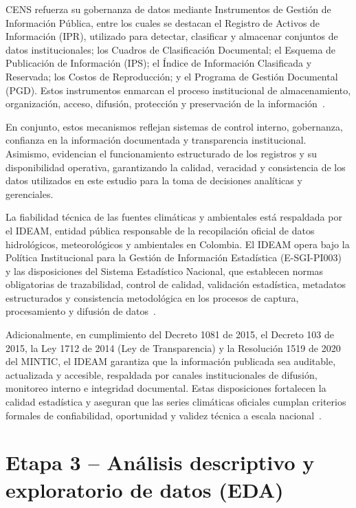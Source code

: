CENS refuerza su gobernanza de datos mediante Instrumentos de Gestión de Información Pública, entre los cuales se destacan el Registro de Activos de Información (IPR), utilizado para detectar, clasificar y almacenar conjuntos de datos institucionales; los Cuadros de Clasificación Documental; el Esquema de Publicación de Información (IPS); el Índice de Información Clasificada y Reservada; los Costos de Reproducción; y el Programa de Gestión Documental (PGD). Estos instrumentos enmarcan el proceso institucional de almacenamiento, organización, acceso, difusión, protección y preservación de la información~\cite{ref40}.

En conjunto, estos mecanismos reflejan sistemas de control interno, gobernanza, confianza en la información documentada y transparencia institucional. Asimismo, evidencian el funcionamiento estructurado de los registros y su disponibilidad operativa, garantizando la calidad, veracidad y consistencia de los datos utilizados en este estudio para la toma de decisiones analíticas y gerenciales.

La fiabilidad técnica de las fuentes climáticas y ambientales está respaldada por el IDEAM, entidad pública responsable de la recopilación oficial de datos hidrológicos, meteorológicos y ambientales en Colombia. El IDEAM opera bajo la Política Institucional para la Gestión de Información Estadística (E-SGI-PI003)~\cite{ref41} y las disposiciones del Sistema Estadístico Nacional, que establecen normas obligatorias de trazabilidad, control de calidad, validación estadística, metadatos estructurados y consistencia metodológica en los procesos de captura, procesamiento y difusión de datos~\cite{ref42}.

Adicionalmente, en cumplimiento del Decreto 1081 de 2015, el Decreto 103 de 2015, la Ley 1712 de 2014 (Ley de Transparencia) y la Resolución 1519 de 2020 del MINTIC, el IDEAM garantiza que la información publicada sea auditable, actualizada y accesible, respaldada por canales institucionales de difusión, monitoreo interno e integridad documental. Estas disposiciones fortalecen la calidad estadística y aseguran que las series climáticas oficiales cumplan criterios formales de confiabilidad, oportunidad y validez técnica a escala nacional~\cite{ref41,ref42,ref43}.


\section{Etapa 3 – Análisis descriptivo y exploratorio de datos (EDA)}

